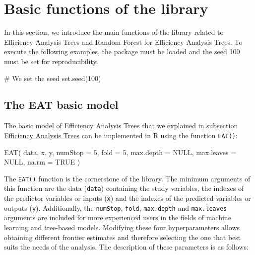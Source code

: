 \hypertarget{section4}{%
\section{Basic functions of the library}\label{section4}}

In this section, we introduce the main functions of the library related
to Efficiency Analysis Trees and Random Forest for Efficiency Analysis
Trees. To execute the following examples, the package  must be
loaded and the seed 100 must be set for reproducibility.

\begin{Schunk}
\begin{Sinput}
# We set the seed
set.seed(100)
\end{Sinput}
\end{Schunk}

\hypertarget{the-eat-basic-model}{%
\subsection{The EAT basic model}\label{the-eat-basic-model}}

The basic model of Efficiency Analysis Trees that we explained in
subsection \protect\hyperlink{section2.1}{Efficiency Analysis Trees} can
be implemented in R using the function \texttt{EAT()}:

\begin{Schunk}
\begin{Sinput}
EAT(
  data, x, y,
  numStop = 5,
  fold = 5,
  max.depth = NULL,
  max.leaves = NULL,
  na.rm = TRUE
)
\end{Sinput}
\end{Schunk}

The \texttt{EAT()} function is the cornerstone of the  library.
The minimum arguments of this function are the data (\texttt{data})
containing the study variables, the indexes of the predictor variables
or inputs (\texttt{x}) and the indexes of the predicted variables or
outputs (\texttt{y}). Additionally, the \texttt{numStop}, \texttt{fold},
\texttt{max.depth} and \texttt{max.leaves} arguments are included for
more experienced users in the fields of machine learning and tree-based
models. Modifying these four hyperparameters allows obtaining different
frontier estimates and therefore selecting the one that best suits the
needs of the analysis. The description of these parameters is as
follows:

